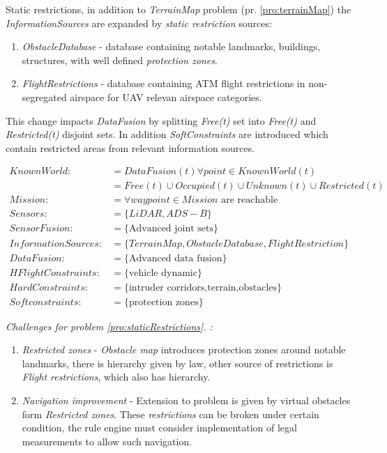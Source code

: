 \begin{problem}{Static restrictions}\label{pro:staticRestrictions},
    in addition to \emph{TerrainMap} problem (pr. \ref{pro:terrainMap}) the \emph{InformationSources} are expanded by \emph{static restriction} sources: 
    \begin{enumerate}
        \item \emph{ObstacleDatabase} - database containing notable landmarks, buildings, structures, with well defined \emph{protection zones}.
        \item \emph{FlightRestrictions} - database containing ATM flight restrictions in non-segregated airspace for UAV relevan airspace categories. 
    \end{enumerate}
    \noindent This change impacts \emph{DataFusion} by splitting \emph{Free(t)} set into \emph{Free(t)} and \emph{Restricted(t)} disjoint sets. In addition \emph{SoftConstraints} are introduced which contain restricted areas from relevant information sources.  
    
    \begin{equation}\label{eq:staticRestrictionsProblemDefinition}
        \begin{aligned}
            KnownWorld:&= DataFusion(t)\forall point\in KnownWorld(t)\\
                       &=Free(t) \cup Occupied(t) \cup Unknown(t)\cup Restricted(t)\\
            Mission:&= \forall waypoint\in Mission \text{ are reachable}\\
            Sensors:&= \{LiDAR,ADS-B\}\\
            SensorFusion:&= \{\text{Advanced joint sets}\}\\
            InformationSources:&=\{Terrain Map,Obstacle Database,Flight Restriction\}\\
            DataFusion:&= \{\text{Advanced data fusion}\}\\
            HFlightConstraints:&=\{\text{vehicle dynamic}\}\\
            HardConstraints:&=\{\text{intruder corridors,terrain,obstacles}\}\\
            Softconstraints:&=\{\text{protection zones}\}
        \end{aligned}
    \end{equation}
    
    \ifproblemchallenge
    \noindent \emph{Challenges for problem  \ref{pro:staticRestrictions}. :}
    \begin{enumerate}
        \item \emph{Restricted zones} - \emph{Obstacle map} introduces protection zones around notable landmarks, there is hierarchy given by law, other source of restrictions is \emph{Flight restrictions}, which also has hierarchy. 
        \item \emph{Navigation improvement} - Extension to problem is given by virtual obstacles form \emph{Restricted zones}. These \emph{restrictions} can be broken under certain condition, the rule engine must consider implementation of legal measurements to allow such navigation. 
    \end{enumerate}
    \fi
\end{problem}

